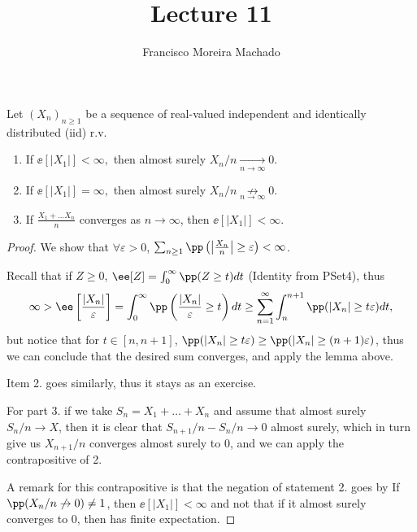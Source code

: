 \documentclass[../main.tex]{subfiles}
\author{Francisco Moreira Machado}
\title{Lecture 11}
\begin{document}
  \begin{corollary}
    Let $(X_n)_{n \geq 1}$ be a sequence of real-valued independent and identically
    distributed (iid) r.v. 
    \begin{enumerate}
      \item If $\ee[|X_1|] < \infty,$ then almost surely $X_n / n \underset{n
        \to \infty}{\to} 0$.
      \item If $\ee[|X_1|] = \infty,$ then almost surely $X_n / n \underset{n
        \to \infty}{\not\to} 0$.
      \item If $\frac{X_1 + \ldots X_n}{n} $ converges as $n \to \infty$, then
        $\ee[|X_1|] < \infty$.
    \end{enumerate}
  \end{corollary}
  \begin{proof}
      We show that $\forall \varepsilon > 0$, $\sum_{n \geq 1} \pp 
      \left( \left| \frac{X_n}{n}  \right| \geq \varepsilon \right) < \infty$.
      
      \vspace{0.5em}

      Recall that if $Z \geq 0$, $\ee[Z] = \int_0^\infty \pp(Z \geq t) dt$
      (Identity from PSet4), thus
      \[
        \infty > \ee \left[ \frac{|X_n|}{\varepsilon}  \right] = \int_{0}^\infty
        \pp \left( \frac{|X_n|}{\varepsilon} \geq t \right)dt \geq \sum_{n =
        1}^\infty \int_{n}^{n+1} \pp(|X_n| \geq t \varepsilon)dt
      ,\] 
      but notice that for $t \in [n, n+1]$, $\pp(|X_n| \geq t \varepsilon) \geq
      \pp(|X_n| \geq (n+1)\varepsilon)$, thus we can conclude that the desired
      sum converges, and apply the lemma above.

      \vspace{1em}
      Item 2. goes similarly, thus it stays as an exercise. 

      \vspace{1em}

      For part 3. if we take $S_n = X_1 + \ldots + X_n$ and assume that almost
      surely $S_n / n \to X$, then it is clear that $S_{n+1}/n - S_n/n \to 0$
      almost surely, which in turn give us $X_{n+1}/n$ converges almost surely 
      to $0$, and we can apply the contrapositive of 2.

      \vspace{0.3em}

      A remark for this contrapositive is that the negation of statement 2. goes
      by If $\pp(X_n/n \not\to 0) \neq 1$, then $\ee[|X_1|] < \infty$ and not
      that if it almost surely converges to $0$, then has finite expectation.
  \end{proof}
\end{document}
